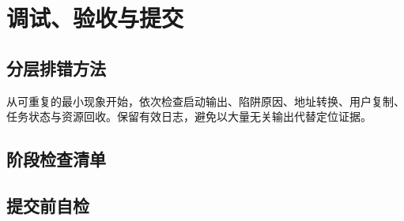 \chapter{调试、验收与提交}

\section{分层排错方法}
从可重复的最小现象开始，依次检查启动输出、陷阱原因、地址转换、用户复制、任务状态与资源回收。保留有效日志，避免以大量无关输出代替定位证据。

\section{阶段检查清单}

\section{提交前自检}
